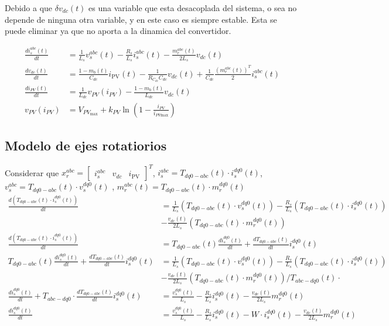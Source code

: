 \documentclass[11pt, a4paper]{article}
\newcommand{\der}[1]{\frac{d #1(t)}{dt}}
\begin{document}
Debido a que $\delta v_{dc}(t)$ es una variable que esta desacoplada del sistema, o sea no depende de ninguna otra variable, y en este caso es siempre estable. Esta se puede eliminar ya que no aporta a la dinamica del convertidor.

\begin{align*}
    \frac{d i_{s}^{abc}(t)}{d t} &= \frac{1}{L_{s}} v_{s}^{abc}(t) - \frac{R_{s}}{L_{s}} i_{s}^{abc}(t) - \frac{m_r^{abc}(t)}{2 L_s} v_{dc}(t)  \\[12pt]
    \der{v_{dc}}&=\frac{1-m_b(t)}{C_{dc}}i_{\text{PV}}(t)-\frac{1}{R_{C_{dc}}C_{dc}}v_{dc}(t)+\frac{1}{C_{dc}}\frac{(m_r^{abc}(t))^T}{2}i_s^{abc}(t) \\[12pt]
    \frac{d i_{PV}(t)}{d t} &= \frac{1}{L_{dc}} v_{PV}(i_{PV}) - \frac{1 - m_{b}(t)}{L_{dc}} v_{dc}(t) \\[12pt]
    v_{PV}(i_{PV})&=V_{PV_\text{max}}+k_{PV}\ln\left(1-\frac{i_{PV}}{i_{PV\text{max}}}\right)
\end{align*}

\subsection*{Modelo de ejes rotatiorios}
Considerar que $x_r^{abc}=\begin{bmatrix} i_s^{abc} & v_{dc} & i_\text{PV}\end{bmatrix}^T$, $i_s^{abc}=T_{dq0-abc}(t)\cdot i_s^{dq0}(t)$, $v_s^{abc}=T_{dq0-abc}(t)\cdot v_s^{dq0}(t)$ , $m_r^{abc}(t)=T_{dq0-abc}(t)\cdot m_r^{dq0}(t)$
\begin{align*}
    \frac{d(T_{dq0-abc}(t)\cdot i_s^{dq0}(t))}{d t} &= \frac{1}{L_{s}} \left(T_{dq0-abc}(t) \cdot v_{s}^{dq0}(t)\right) - \frac{R_{s}}{L_{s}} \left(T_{dq0-abc}(t) \cdot i_s^{dq0}(t)\right) \\ &- \frac{v_{dc}(t)}{2 L_s}\left(T_{dq0-abc}(t)\cdot m_r^{dq0}(t)\right) \\[12pt]
    \frac{d(T_{dq0-abc}(t)\cdot i_s^{dq0}(t))}{d t} &=T_{dq0-abc}(t)\der{i_s^{dq0}}+\der{T_{dq0-abc}}i_s^{dq0}(t)\\[12pt]
    T_{dq0-abc}(t)\der{i_s^{dq0}}+\der{T_{dq0-abc}}i_s^{dq0}(t) &=\frac{1}{L_{s}} \left(T_{dq0-abc}(t) \cdot v_{s}^{dq0}(t)\right) - \frac{R_{s}}{L_{s}} \left(T_{dq0-abc}(t) \cdot i_s^{dq0}(t)\right) \\ &- \frac{v_{dc}(t)}{2 L_s}\left(T_{dq0-abc}(t)\cdot m_r^{dq0}(t)\right) \bigg / T_{abc-dq0}(t)\cdot \\[12pt]
    \der{i_s^{dq0}}+T_{abc-dq0}\cdot\der{T_{dq0-abc}}i_s^{dq0}(t) &= \frac{v_s^{dq0}(t)}{L_s}-\frac{R_s}{L_s}i_s^{dq0}(t)-\frac{v_{dc}(t)}{2L_s}m_r^{dq0}(t) \\[12pt]
    \der{i_s^{dq0}} &= \frac{v_s^{dq0}(t)}{L_s}-\frac{R_s}{L_s}i_s^{dq0}(t)- W\cdot i_s^{dq0}(t)-\frac{v_{dc}(t)}{2L_s}m_r^{dq0}(t)
\end{align*}
\end{document}
